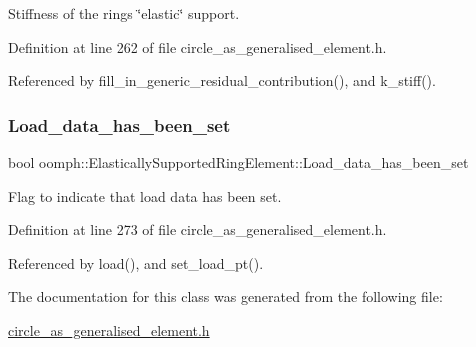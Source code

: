 Stiffness of the ring\textquotesingle{}s \char`\"{}elastic\char`\"{} support. 



Definition at line 262 of file circle\+\_\+as\+\_\+generalised\+\_\+element.\+h.



Referenced by fill\+\_\+in\+\_\+generic\+\_\+residual\+\_\+contribution(), and k\+\_\+stiff().

\mbox{\label{classoomph_1_1ElasticallySupportedRingElement_a98151ae912af71c1a78ddae80c4fbb04}} 
\subsubsection{\texorpdfstring{Load\+\_\+data\+\_\+has\+\_\+been\+\_\+set}{Load\_data\_has\_been\_set}}
{\footnotesize\ttfamily bool oomph\+::\+Elastically\+Supported\+Ring\+Element\+::\+Load\+\_\+data\+\_\+has\+\_\+been\+\_\+set\hspace{0.3cm}{\ttfamily [private]}}



Flag to indicate that load data has been set. 



Definition at line 273 of file circle\+\_\+as\+\_\+generalised\+\_\+element.\+h.



Referenced by load(), and set\+\_\+load\+\_\+pt().



The documentation for this class was generated from the following file\+:\begin{DoxyCompactItemize}
\item 
\hyperlink{circle__as__generalised__element_8h}{circle\+\_\+as\+\_\+generalised\+\_\+element.\+h}\end{DoxyCompactItemize}
